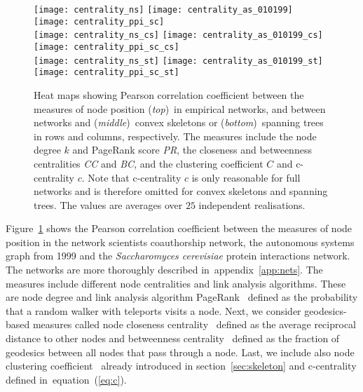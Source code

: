 \documentclass[]{rsif}
\newcommand{\secref}[1]{section~\ref{sec:#1}\xspace}
\newcommand{\Figref}[1]{Figure~\ref{fig:#1}\xspace}
\renewcommand{\eqref}[1]{equation~(\ref{eq:#1})\xspace}
\newcommand{\appref}[1]{appendix~\ref{app:#1}\xspace}
\newcommand{\scere}{\emph{Saccharomyces cerevisiae}\xspace}
\begin{document}
\begin{figure}[t]
	\centering\texttt{[image: centrality\_ns]}\textwidth%
	\texttt{[image: centrality\_as\_010199]}\textwidth%
	\texttt{[image: centrality\_ppi\_sc]}\\\textwidth%
	\texttt{[image: centrality\_ns\_cs]}\textwidth%
	\texttt{[image: centrality\_as\_010199\_cs]}\textwidth%
	\texttt{[image: centrality\_ppi\_sc\_cs]}\\\textwidth%
	\texttt{[image: centrality\_ns\_st]}\textwidth%
	\texttt{[image: centrality\_as\_010199\_st]}\textwidth%
	\texttt{[image: centrality\_ppi\_sc\_st]}%
	\caption{\label{fig:centrality}Heat maps showing Pearson correlation coefficient between the measures of node position (\emph{top})~in empirical networks, and between networks and (\emph{middle})~convex skeletons or (\emph{bottom})~spanning trees in rows and columns, respectively. The measures include the node degree $k$ and PageRank score {\it PR}, the closeness and betweenness centralities {\it CC} and {\it BC}, and the clustering coefficient $C$ and c-centrality $c$. Note that c-centrality $c$ is only reasonable for full networks and is therefore omitted for convex skeletons and spanning trees. The values are averages over $25$ independent realisations.} 
\end{figure}

\Figref{centrality} shows the Pearson correlation coefficient between the measures of node position in the network scientists coauthorship network, the autonomous systems graph from 1999 and the \scere protein interactions network. The networks are more thoroughly described in~\appref{nets}. The measures include different node centralities and link analysis algorithms. These are node degree and link analysis algorithm PageRank~\cite{BP98} defined as the probability that a random walker with teleports visits a node. Next, we consider geodesics-based measures called node closeness centrality~\cite{Bav50} defined as the average reciprocal distance to other nodes and betweenness centrality~\cite{Fre77} defined as the fraction of geodesics between all nodes that pass through a node. Last, we include also node clustering coefficient~\cite{WS98} already introduced in \secref{skeleton} and c-centrality defined in~\eqref{c}.
\end{document}
